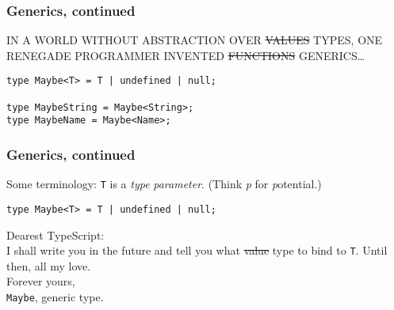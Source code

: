 \documentclass{beamer}
\begin{document}
\begin{frame}[fragile]
  \frametitle{Generics, continued}

  IN A WORLD WITHOUT ABSTRACTION OVER \sout{VALUES} TYPES, ONE RENEGADE
  PROGRAMMER INVENTED \sout{FUNCTIONS} GENERICS\ldots \\

  \begin{verbatim}
type Maybe<T> = T | undefined | null;

type MaybeString = Maybe<String>;
type MaybeName = Maybe<Name>;
  \end{verbatim}
\end{frame}

\begin{frame}[fragile]
  \frametitle{Generics, continued}

  Some terminology: \texttt{T} is a \emph{type} \textit{parameter}. (Think
  \textit{p} for \textit{p}otential.) \\

  \begin{verbatim}
type Maybe<T> = T | undefined | null;
  \end{verbatim}

  \vspace{1em}

  \begin{tcolorbox}
    Dearest TypeScript: \\

    I shall write you in the future and tell you what \sout{value} type to
    bind to \texttt{T}. Until then, all my love. \\

    Forever yours, \\
    \texttt{Maybe}, generic type.
  \end{tcolorbox}
\end{frame}
\end{document}
